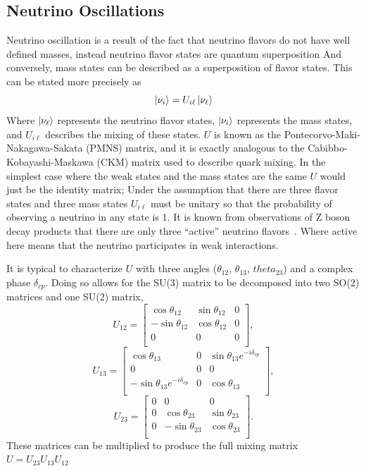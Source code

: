 
\subsection{Neutrino Oscillations}
\label{sec:neut_osc}
Neutrino oscillation is a result of the fact that neutrino flavors do not have
well defined masses, instead neutrino flavor states are quantum superposition
And conversely, mass states can be described as a superposition of flavor states.
This can be stated more precisely as
\begin{equation}
    \ket{\nu_{i}} = U_{i\ell}\ket{\nu_\ell}
\end{equation}
Where $\ket{\nu_\ell}$ represents the neutrino flavor states, $\ket{\nu_i}$
represents the mass states, and $U_{i\ell}$ describes the mixing of these
states. $U$ is known as the Pontecorvo-Maki-Nakagawa-Sakata (PMNS) matrix,
and it is exactly analogous to the Cabibbo-Kobayashi-Maskawa (CKM) matrix used
to describe quark mixing.
In the simplest case where the weak states and the mass states are the same
$U$ would just be the identity matrix;
Under the assumption that there are three flavor states and three mass states
$U_{i\ell}$ must be unitary so that the probability of observing
a neutrino in any state is 1.
It is known from observations of Z boson decay products that
there are only three ``active'' neutrino flavors~\cite{Zbosondecaypaper}.
Where active here means that the neutrino participates in
weak interactions.

It is typical to characterize $U$ with three angles
($\theta_{12}$, $\theta_{13}$, $theta_{23}$) and a complex
phase $\delta_{cp}$. Doing so allows for the SU(3) matrix to
be decomposed into two SO(2) matrices and one SU(2) matrix,
$$U_{12} =
\begin{bmatrix}
    \cos\theta_{12} & \sin\theta_{12} & 0  \\
    -\sin\theta_{12}& \cos\theta_{12} & 0  \\
    0 & 0 & 0  \\
\end{bmatrix},
$$
$$
U_{13} =
\begin{bmatrix}
    \cos\theta_{13} & 0 & \sin\theta_{13}e^{-i\delta_{cp}}\\
    0 & 0 & 0  \\
    -\sin\theta_{13} e^{-i\delta_{cp}} & 0 & \cos\theta_{13}  \\
\end{bmatrix},
$$
$$
U_{23} =
\begin{bmatrix}
    0 & 0 & 0  \\
    0 & \cos\theta_{23} & \sin\theta_{23} \\
    0 & -\sin\theta_{23} & \cos\theta_{23}   \\
\end{bmatrix}.
$$
These matrices can be multiplied to produce the full mixing matrix
$U = U_{23}U_{13}U_{12}$

